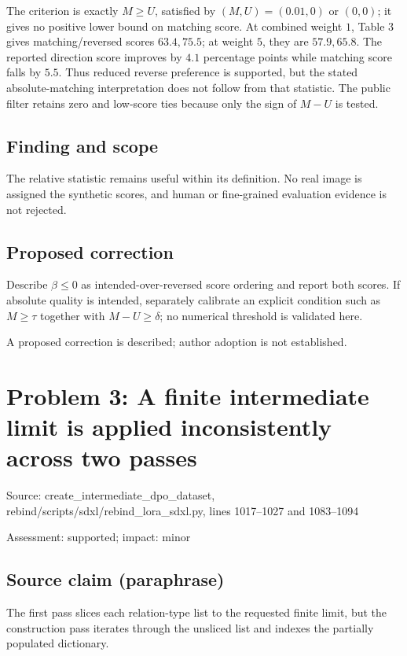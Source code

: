 \documentclass[11pt]{article}
\begin{document}
The criterion is exactly \(M\ge U\), satisfied by \((M,U)=(0.01,0)\) or \((0,0)\); it gives no positive lower bound on matching score. At combined weight \(1\), Table 3 gives matching/reversed scores \(63.4,75.5\); at weight \(5\), they are \(57.9,65.8\). The reported direction score improves by \(4.1\) percentage points while matching score falls by \(5.5\). Thus reduced reverse preference is supported, but the stated absolute-matching interpretation does not follow from that statistic. The public filter retains zero and low-score ties because only the sign of \(M-U\) is tested.

\subsection*{Finding and scope}

The relative statistic remains useful within its definition. No real image is assigned the synthetic scores, and human or fine-grained evaluation evidence is not rejected.

\subsection*{Proposed correction}

Describe \(\beta\le0\) as intended-over-reversed score ordering and report both scores. If absolute quality is intended, separately calibrate an explicit condition such as \(M\ge\tau\) together with \(M-U\ge\delta\); no numerical threshold is validated here.

A proposed correction is described; author adoption is not established.

\section*{Problem 3: A finite intermediate limit is applied inconsistently across two passes}

Source: create\_intermediate\_dpo\_dataset, rebind/scripts/sdxl/rebind\_lora\_sdxl.py, lines 1017–1027 and 1083–1094

Assessment: supported; impact: minor

\subsection*{Source claim (paraphrase)}

The first pass slices each relation-type list to the requested finite limit, but the construction pass iterates through the unsliced list and indexes the partially populated dictionary.
\end{document}
